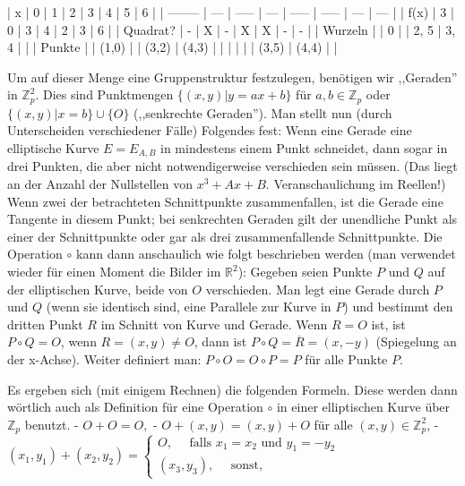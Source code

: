 \documentclass[a4paper]{article}
\begin{document}
\begin{multicols}{3}
{{{{            | x        | 0   | 1     | 2   | 3     | 4     | 5   | 6   |
            | -------- | --- | ----- | --- | ----- | ----- | --- | --- |
            | f(x)     | 3   | 0     | 3   | 4     | 2     | 3   | 6   |
            | Quadrat? | -   | X     | -   | X     | X     | -   | -   |
            | Wurzeln  |     | 0     |     | 2, 5  | 3, 4  |     |
            | Punkte   |     | (1,0) |     | (3,2) | (4,3) |
            |          |     |       |     | (3,5) | (4,4) |     |

            Um auf dieser Menge eine Gruppenstruktur festzulegen, benötigen wir ,,Geraden'' in $\mathbb{Z}^2_p$. Dies sind Punktmengen $\{(x,y)|y=ax+b\}$ für $a,b\in\mathbb{Z}_p$ oder $\{(x,y)|x=b\}\cup\{O\}$ (,,senkrechte Geraden''). Man stellt nun (durch Unterscheiden verschiedener Fälle) Folgendes fest: Wenn eine Gerade eine elliptische Kurve $E=E_{A,B}$ in mindestens einem Punkt schneidet, dann sogar in drei Punkten, die aber nicht notwendigerweise verschieden sein müssen. (Das liegt an der Anzahl der Nullstellen von $x^3+Ax+B$. Veranschaulichung im Reellen!)
            Wenn zwei der betrachteten Schnittpunkte zusammenfallen, ist die Gerade eine Tangente in diesem Punkt; bei senkrechten Geraden gilt der unendliche Punkt als einer der Schnittpunkte oder gar als drei zusammenfallende Schnittpunkte.
            Die Operation $\circ$ kann dann anschaulich wie folgt beschrieben werden (man verwendet wieder für einen Moment die Bilder im $\mathbb{R}^2$): Gegeben seien Punkte $P$ und $Q$ auf der elliptischen Kurve, beide von $O$ verschieden. Man legt eine Gerade durch $P$ und $Q$ (wenn sie identisch sind, eine Parallele zur Kurve in $P$) und bestimmt den dritten Punkt $R$ im Schnitt von Kurve und Gerade. Wenn $R=O$ ist, ist $P\circ Q=O$, wenn $R= (x,y)\not=O$, dann ist $P\circ Q=\overline{R}= (x,-y)$ (Spiegelung an der x-Achse).
            Weiter definiert man: $P\circ O=O\circ P=P$ für alle Punkte $P$.

            Es ergeben sich (mit einigem Rechnen) die folgenden Formeln. Diese werden dann wörtlich auch als Definition für eine Operation $\circ$ in einer elliptischen Kurve über $\mathbb{Z}_p$ benutzt.
            - $O+O=O,$
            - $O+ (x,y) = (x,y) +O$ für alle $(x,y)\in\mathbb{Z}^2_p$,
            - $(x_1,y_1) + (x_2,y_2) =\begin{cases} O,\quad\text{ falls } x_1=x_2 \text{ und } y_1=-y_2 \\ (x_3,y_3),\quad\text{ sonst,}\end{cases}$

}}}}
\end{multicols}
\end{document}
